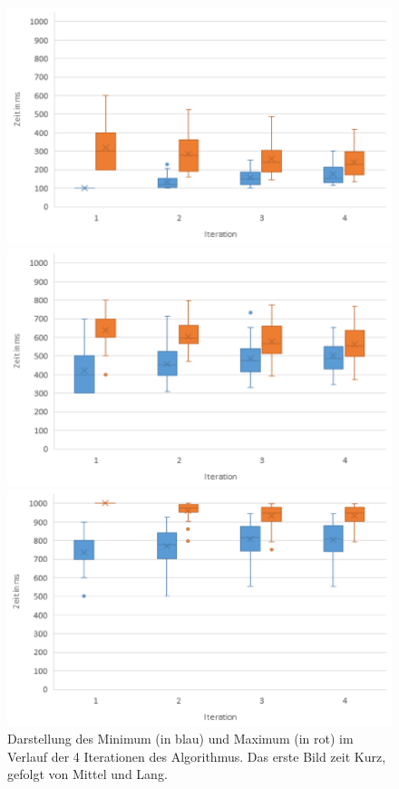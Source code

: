 \begin{figure}[htbp] 
	\centering
	\begin{minipage}[t]{0.8\textwidth}
		\includegraphics[width=\textwidth]{pics/analyse/algo/MinMax/sonstige/KurzMinMax2.png}
	\end{minipage}
	\begin{minipage}[t]{0.8\textwidth}
		\includegraphics[width=\textwidth]{pics/analyse/algo/MinMax/sonstige/MittelMinMax2.png}
	\end{minipage}
\begin{minipage}[t]{0.8\textwidth}
		\includegraphics[width=\textwidth]{pics/analyse/algo/MinMax/sonstige/LangMinMax2.png}
	\end{minipage}
	\caption{Darstellung des Minimum (in blau) und Maximum (in rot) im Verlauf der 4 Iterationen des Algorithmus. Das erste Bild zeit Kurz, gefolgt von Mittel und Lang.}
	\label{fig:MinMaxSignale}
\end{figure}

